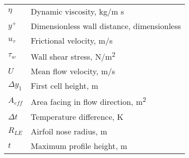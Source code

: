\begin{table}[ht]
\begin{tabular}{ll}
$\eta$&Dynamic viscosity, kg/m s\\
$y^+$&Dimensionless wall distance, dimensionless\\
$u_{\tau}$&Frictional velocity, m/s\\
$\tau_w$&Wall shear stress, N/m\textsuperscript{2}\\
$U$&Mean flow velocity, m/s\\
$\Delta y_1$&First cell height, m\\
$A_{eff}$&Area facing in flow direction, m\textsuperscript{2}\\
$\Delta t$&Temperature difference, K\\
$R_{LE}$&Airfoil nose radius, m\\
$t$&Maximum profile height, m\\
\end{tabular}
\end{table}